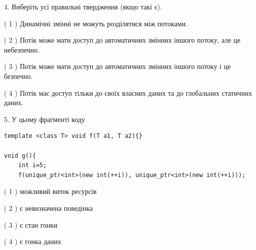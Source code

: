 \documentclass[12pt, ukrainian]{article}
\begin{document}
\begin {large}
{%
4. Виберіть усі правильні твердження (якщо такі є).\par
\vspace{2mm}

( 1 ) Динамічні змінні не можуть розділятися між потоками.%

( 2 ) Потік може мати доступ до автоматичних змінних іншого потоку, але це небезпечно.%

( 3 ) Потік може мати доступ до автоматичних змінних іншого потоку і це безпечно.%

( 4 ) Потік має доступ тільки до своїх власних даних та до глобальних статичних даних.%


5. У цьому фрагменті коду
\begin{verbatim}
template <class T> void f(T a1, T a2){}

void g(){
    int i=5;
    f(unique_ptr<int>(new int(++i)), unique_ptr<int>(new int(++i)));
\end{verbatim}

( 1 ) можливий виток ресурсів%

( 2 ) є невизначена поведінка%

( 3 ) є стан гонки%

( 4 ) є гонка даних%
}
\end {large}
\end{document}

